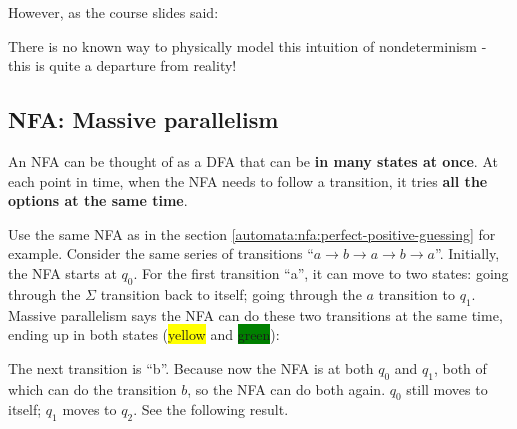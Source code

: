 \documentclass[12pt, letterpaper, oneside]{book}
\begin{document}
However, as the course slides said:

\begin{displayquote}
  There is no known way to physically model this intuition of nondeterminism - this is quite a departure from reality!
\end{displayquote}

\subsection{NFA: Massive parallelism}

An NFA can be thought of as a DFA that can be \textbf{in many states at once}. At each point in time, when the NFA
needs to follow a transition, it tries \textbf{all the options at the same time}.

Use the same NFA as in the section \ref{automata:nfa:perfect-positive-guessing} for example. Consider the same series
of transitions ``$a \rightarrow b \rightarrow a \rightarrow b \rightarrow a$''. Initially, the NFA starts at $q_0$. For
the first transition ``a'', it can move to two states: going through the $\Sigma$ transition back to itself; going
through the $a$ transition to $q_1$. Massive parallelism says the NFA can do these two transitions at the same time,
ending up in both states (\colorbox{yellow}{yellow} and \colorbox{green}{green}):


The next transition is ``b''. Because now the NFA is at both $q_0$ and $q_1$, both of which can do the transition $b$,
so the NFA can do both again. $q_0$ still moves to itself; $q_1$ moves to $q_2$. See the following result.
\end{document}
